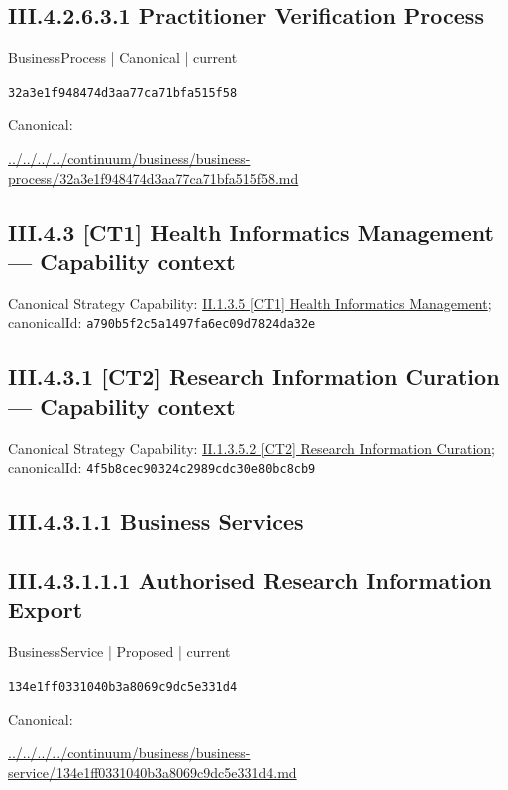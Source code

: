 \documentclass[10pt,a4paper]{article}
\begin{document}
\subsection*{III.4.2.6.3.1 Practitioner Verification Process}
\label{element-32a3e1f948474d3aa77ca71bfa515f58}
{\small BusinessProcess | Canonical | current}\par
\texttt{32a3e1f948474d3aa77ca71bfa515f58}\par
Canonical: \par
{\footnotesize\url{../../../../continuum/business/business-process/32a3e1f948474d3aa77ca71bfa515f58.md}}\par
\subsection*{III.4.3 [CT1] Health Informatics Management — Capability context}
Canonical Strategy Capability: \hyperref[element-a790b5f2c5a1497fa6ec09d7824da32e]{II.1.3.5 [CT1] Health Informatics Management}; canonicalId: \texttt{a790b5f2c5a1497fa6ec09d7824da32e}\par
\subsection*{III.4.3.1 [CT2] Research Information Curation — Capability context}
Canonical Strategy Capability: \hyperref[element-4f5b8cec90324c2989cdc30e80bc8cb9]{II.1.3.5.2 [CT2] Research Information Curation}; canonicalId: \texttt{4f5b8cec90324c2989cdc30e80bc8cb9}\par
\subsection*{III.4.3.1.1 Business Services}
\subsection*{III.4.3.1.1.1 Authorised Research Information Export}
\label{element-134e1ff0331040b3a8069c9dc5e331d4}
{\small BusinessService | Proposed | current}\par
\texttt{134e1ff0331040b3a8069c9dc5e331d4}\par
Canonical: \par
{\footnotesize\url{../../../../continuum/business/business-service/134e1ff0331040b3a8069c9dc5e331d4.md}}\par
\end{document}
